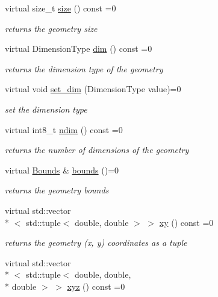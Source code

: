 \begin{DoxyCompactItemize}
virtual size\-\_\-t \hyperlink{classsimo_1_1shapes_1_1_geometry_a110e8a897b84c704f9009679bbbe21fc}{size} () const =0
\begin{DoxyCompactList}\small\item\em returns the geometry size \end{DoxyCompactList}\item 
virtual Dimension\-Type \hyperlink{classsimo_1_1shapes_1_1_geometry_a8db862418cec85fc52c832267449d392}{dim} () const =0
\begin{DoxyCompactList}\small\item\em returns the dimension type of the geometry \end{DoxyCompactList}\item 
virtual void \hyperlink{classsimo_1_1shapes_1_1_geometry_adbd7a14a8b4414c882cbcafa8025085d}{set\-\_\-dim} (Dimension\-Type value)=0
\begin{DoxyCompactList}\small\item\em set the dimension type \end{DoxyCompactList}\item 
virtual int8\-\_\-t \hyperlink{classsimo_1_1shapes_1_1_geometry_ab4890550ac2208165a5953a989d0b2aa}{ndim} () const =0
\begin{DoxyCompactList}\small\item\em returns the number of dimensions of the geometry \end{DoxyCompactList}\item 
virtual \hyperlink{classsimo_1_1shapes_1_1_bounds}{Bounds} \& \hyperlink{classsimo_1_1shapes_1_1_geometry_a0ed6566c6f79af7255f5950bd44f2a1e}{bounds} ()=0
\begin{DoxyCompactList}\small\item\em returns the geometry bounds \end{DoxyCompactList}\item 
virtual std\-::vector\\*
$<$ std\-::tuple$<$ double, double $>$ $>$ \hyperlink{classsimo_1_1shapes_1_1_geometry_aa45dedcadd8e44be1f9415223ca2e19d}{xy} () const =0
\begin{DoxyCompactList}\small\item\em returns the geometry (x, y) coordinates as a tuple \end{DoxyCompactList}\item 
virtual std\-::vector\\*
$<$ std\-::tuple$<$ double, double, \\*
double $>$ $>$ \hyperlink{classsimo_1_1shapes_1_1_geometry_af1a38df76e835270559acad85366f6f3}{xyz} () const =0

\end{DoxyCompactItemize}
